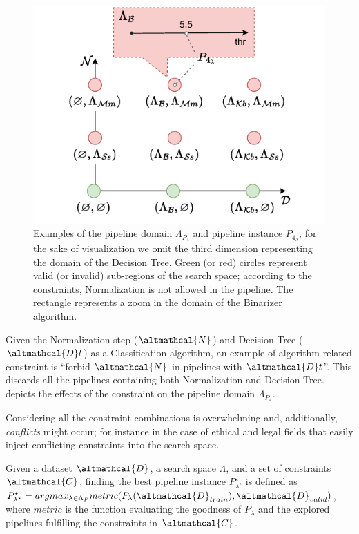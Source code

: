 \begin{figure}
    \centering
    \includegraphics[scale=.75]{chapters/human-centric/hamlet/img/toy_example_ss.pdf}
    \caption{Examples of the pipeline domain $\Lambda_{P_4}$ and pipeline instance $P_{4_{\lambda}}$, for the sake of visualization we omit the third dimension representing the domain of the Decision Tree. Green (or red) circles represent valid (or invalid) sub-regions of the search space; according to the constraints, Normalization is not allowed in the pipeline. The rectangle represents a zoom in the domain of the Binarizer algorithm.}
    \label{hamlet-fig:space}
\end{figure}


\begin{example}[Constraint]
Given the Normalization step ($\altmathcal{N}$) and Decision Tree ($\altmathcal{D}t$) as a Classification algorithm, an example of algorithm-related constraint is ``forbid $\altmathcal{N}$ in pipelines with $\altmathcal{D}t$''.
This discards all the pipelines containing both Normalization and Decision Tree.
 depicts the effects of the constraint on the pipeline domain $\Lambda_{P_4}$.
\label{ex:constraints}
\end{example}

Considering all the constraint combinations is overwhelming and, additionally, \emph{conflicts} might occur; for instance in the case of ethical \cite{boston-house} and legal fields that easily inject conflicting constraints into the search space.

\begin{definition}
Given a dataset $\altmathcal{D}$, a search space $\Lambda$, and a set of constraints $\altmathcal{C}$, finding the best pipeline instance $P^{\star}_{\lambda^{\star}}$ is defined as $P^{\star}_{\lambda^{\star}} = argmax_{\lambda \in \Lambda_P} metric(P_{\lambda}(\altmathcal{D}_{train}), \altmathcal{D}_{valid})$, where $metric$ is the function evaluating the goodness of $P_{\lambda}$ and the explored pipelines fulfilling the constraints in $\altmathcal{C}$.
\end{definition}


